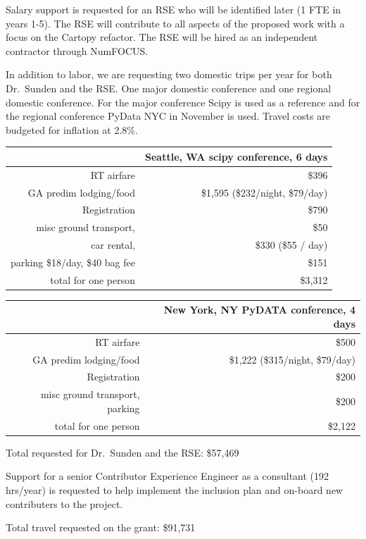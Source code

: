 \documentclass[12pt]{article}
\numberwithin{page}{section}
\begin{document}
Salary support is requested for an RSE who will be identified later (1 FTE in
years 1-5).  The RSE will contribute to all aspects of the proposed work with a
focus on the Cartopy refactor.  The RSE will be hired as an independent
contractor through NumFOCUS.

In addition to labor, we are requesting two domestic trips per year for both
Dr.\ Sunden and the RSE.  One major domestic conference and one regional
domestic conference.  For the major conference Scipy is used as a reference and
for the regional conference PyData NYC in November is used.  Travel costs are
budgeted for inflation at 2.8\%.

\begin{tabular}{|r|r|}
  \hline
  & Seattle, WA scipy conference, 6 days\\\hline
  RT airfare & \$396 \\\hline
  GA predim lodging/food & \$1,595 (\$232/night, \$79/day) \\\hline
  Registration & \$790 \\\hline
  misc ground transport, & \$50 \\\hline
  car rental, & \$330 (\$55 / day) \\\hline
  parking \@ \$18/day, \$40 bag fee & \$151 \\\hline\hline
  total for one person & \$3,312    \\\hline
\end{tabular}


\begin{tabular}{|r|r|}
  \hline
  & New York, NY  PyDATA conference, 4 days\\\hline
  RT airfare & \$500     \\\hline
  GA predim lodging/food & \$1,222 (\$315/night, \$79/day) \\\hline
  Registration & \$200     \\\hline
  misc ground transport, parking & \$200     \\\hline\hline
  total for one person & \$2,122     \\\hline
\end{tabular}

Total requested for Dr.\ Sunden and the RSE: \$57,469

Support for a senior Contributor Experience Engineer as a consultant (192 hrs/year)
is requested to help implement the inclusion plan and on-board new contributers
to the project.

Total travel requested on the grant: \$91,731
\end{document}

